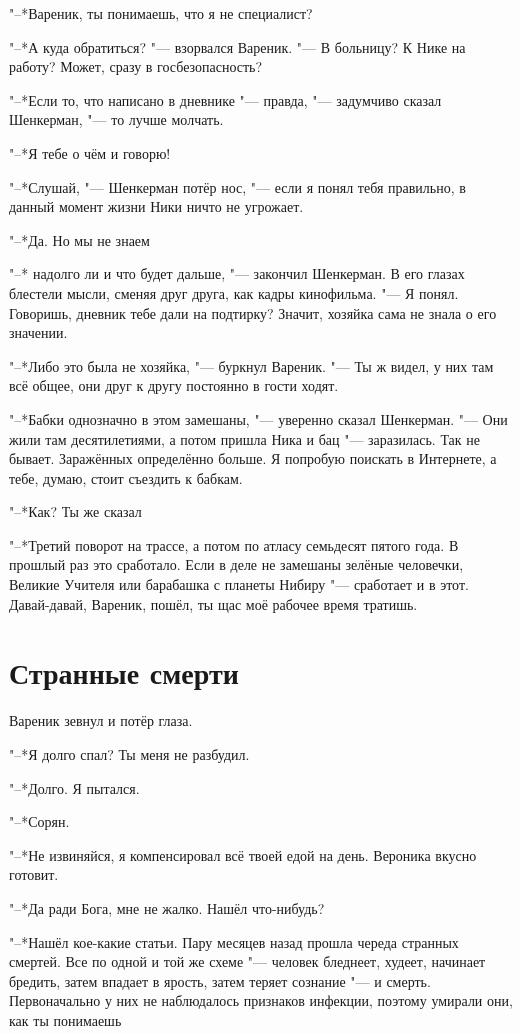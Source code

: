 "--*Вареник, ты понимаешь, что я не специалист?

"--*А куда обратиться? "--- взорвался Вареник.
"--- В больницу?
К Нике на работу?
Может, сразу в госбезопасность?

"--*Если то, что написано в дневнике "--- правда, "--- задумчиво сказал Шенкерман, "--- то лучше молчать.

"--*Я тебе о чём и говорю!

"--*Слушай, "--- Шенкерман потёр нос, "--- если я понял тебя правильно, в данный момент жизни Ники ничто не угрожает.

"--*Да.
Но мы не знаем\ldotst

"--* \ldotst надолго ли и что будет дальше, "--- закончил Шенкерман.
В его глазах блестели мысли, сменяя друг друга, как кадры кинофильма.
"--- Я понял.
Говоришь, дневник тебе дали на подтирку?
Значит, хозяйка сама не знала о его значении.

"--*Либо это была не хозяйка, "--- буркнул Вареник.
"--- Ты ж видел, у них там всё общее, они друг к другу постоянно в гости ходят.

"--*Бабки однозначно в этом замешаны, "--- уверенно сказал Шенкерман.
"--- Они жили там десятилетиями, а потом пришла Ника и бац "--- заразилась.
Так не бывает.
Заражённых определённо больше.
Я попробую поискать в Интернете, а тебе, думаю, стоит съездить к бабкам.

"--*Как?
Ты же сказал\ldotst

"--*Третий поворот на трассе, а потом по атласу семьдесят пятого года.
В прошлый раз это сработало.
Если в деле не замешаны зелёные человечки, Великие Учителя или барабашка с планеты Нибиру "--- сработает и в этот.
Давай-давай, Вареник, пошёл, ты щас моё рабочее время тратишь.

\section{Странные смерти}

Вареник зевнул и потёр глаза.

"--*Я долго спал?
Ты меня не разбудил.

"--*Долго.
Я пытался.

"--*Сорян.

"--*Не извиняйся, я компенсировал всё твоей едой на день.
Вероника вкусно готовит.

"--*Да ради Бога, мне не жалко.
Нашёл что-нибудь?

"--*Нашёл кое-какие статьи.
Пару месяцев назад прошла череда странных смертей.
Все по одной и той же схеме "--- человек бледнеет, худеет, начинает бредить, затем впадает в ярость, затем теряет сознание "--- и смерть.
Первоначально у них не наблюдалось признаков инфекции, поэтому умирали они, как ты понимаешь\ldotst

